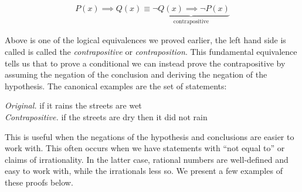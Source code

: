 \documentclass{report}
\begin{document}
\begin{align*}
	P(x) \implies Q(x) \equiv \underbrace{\neg Q(x) \implies \neg P(x)}_\text{contrapositive}
\end{align*}

Above is one of the logical equivalences we proved earlier, the left hand side is called is called the \emph{contrapositive} or \emph{contraposition}.  This fundamental equivalence tells us that to prove a conditional we can instead prove the contrapositive by assuming the negation of the conclusion and deriving the negation of the hypothesis. The canonical examples are the set of statements:

\vspace{\baselineskip}
\begin{center}
	\emph{Original.} if it rains the streets are wet \\
	\emph{Contrapositive.} if the streets are dry then it did not rain
\end{center}
\vspace{\baselineskip}


This is useful when the negations of the hypothesis and conclusions are easier to work with. This often occurs when we have statements with ``not equal to'' or claims of irrationality. In the latter case, rational numbers are well-defined and easy to work with, while the irrationals less so. We present a few examples of these proofs below.


\end{document}
